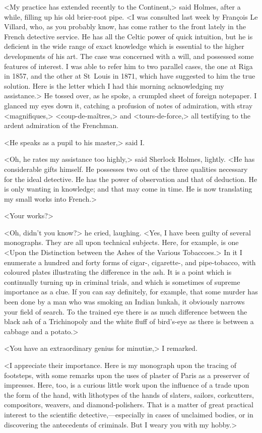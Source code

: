 <My practice has extended recently to the Continent,> said Holmes, after a while, filling up his old brier-root pipe. <I was consulted last week by François Le Villard, who, as you probably know, has come rather to the front lately in the French detective service. He has all the Celtic power of quick intuition, but he is deficient in the wide range of exact knowledge which is essential to the higher developments of his art. The case was concerned with a will, and possessed some features of interest. I was able to refer him to two parallel cases, the one at Riga in 1857, and the other at St~Louis in 1871, which have suggested to him the true solution. Here is the letter which I had this morning acknowledging my assistance.> He tossed over, as he spoke, a crumpled sheet of foreign notepaper. I glanced my eyes down it, catching a profusion of notes of admiration, with stray <magnifiques,> <coup-de-maîtres,> and <tours-de-force,> all testifying to the ardent admiration of the Frenchman.

<He speaks as a pupil to his master,> said I\@.

<Oh, he rates my assistance too highly,> said Sherlock Holmes, lightly. <He has considerable gifts himself. He possesses two out of the three qualities necessary for the ideal detective. He has the power of observation and that of deduction. He is only wanting in knowledge; and that may come in time. He is now translating my small works into French.>

<Your works?>

<Oh, didn't you know?> he cried, laughing. <Yes, I have been guilty of several monographs. They are all upon technical subjects. Here, for example, is one <Upon the Distinction between the Ashes of the Various Tobaccoes.> In it I enumerate a hundred and forty forms of cigar-, cigarette-, and pipe-tobacco, with coloured plates illustrating the difference in the ash. It is a point which is continually turning up in criminal trials, and which is sometimes of supreme importance as a clue. If you can say definitely, for example, that some murder has been done by a man who was smoking an Indian lunkah, it obviously narrows your field of search. To the trained eye there is as much difference between the black ash of a Trichinopoly and the white fluff of bird's-eye as there is between a cabbage and a potato.>

<You have an extraordinary genius for minutiæ,> I remarked.

<I appreciate their importance. Here is my monograph upon the tracing of footsteps, with some remarks upon the uses of plaster of Paris as a preserver of impresses. Here, too, is a curious little work upon the influence of a trade upon the form of the hand, with lithotypes of the hands of slaters, sailors, corkcutters, compositors, weavers, and diamond-polishers. That is a matter of great practical interest to the scientific detective,—especially in cases of unclaimed bodies, or in discovering the antecedents of criminals. But I weary you with my hobby.>

